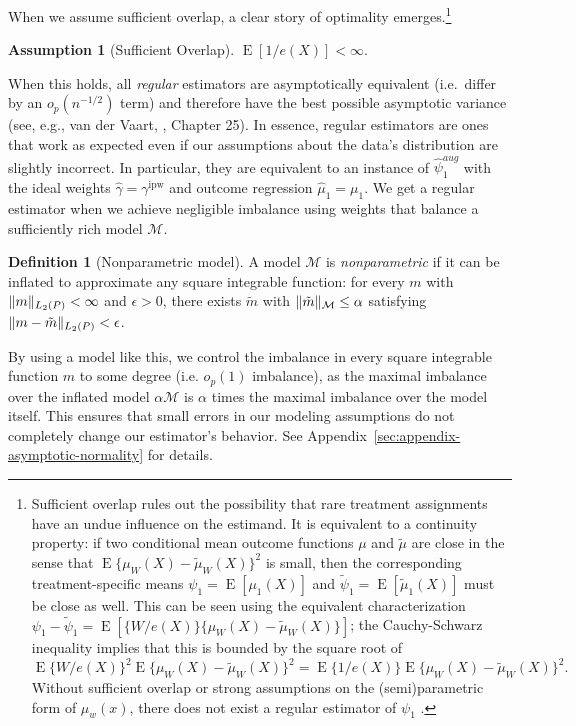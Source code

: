 \documentclass{article}
\DeclarePairedDelimiter\norm{\lVert}{\rVert}
\theoremstyle{definition}
\newtheorem{assumption}{Assumption}
\newtheorem{definition}{Definition}
\DeclareMathOperator{\E}{E}
\newcommand{\ipw}{\text{ipw}}
\newcommand{\hgamma}{\ensuremath{\hat\gamma}}
\newcommand{\gammaipw}{\ensuremath{\gamma^{\ipw}}}
\newcommand{\model}{\mathcal{M}}
\newcommand{\<}{\langle}
\renewcommand{\>}{\rangle}
\begin{document}
When we assume sufficient overlap, a clear story of optimality emerges.\footnote{Sufficient overlap rules out the possibility that rare treatment assignments have an undue influence on the estimand. It is equivalent to a continuity property: if two conditional mean outcome functions $\mu$ and $\tilde \mu$ are close in the sense that $\E \{\mu_W(X)-\tilde \mu_W(X)\}^2$
is small, then the corresponding treatment-specific means $\psi_1=\E[\mu_1(X)]$ and $\tilde\psi_1 = \E[\tilde \mu_1(X)]$ must be close as well. This can be seen using the equivalent characterization $\psi_1-\tilde \psi_1 = \E[\{W/e(X)\} \{\mu_{W}(X)-\tilde \mu_{W}(X)\}]$; the Cauchy-Schwarz inequality implies that this is bounded by the square root of
$\E\{W/e(X)\}^2 \E\{\mu_{W}(X)-\tilde \mu_{W}(X)\}^2=\E\{1/e(X)\} \E\{\mu_{W}(X)-\tilde \mu_{W}(X)\}^2.$
Without sufficient overlap or strong assumptions on the (semi)parametric form of $\mu_w(x)$, there does not exist a regular estimator of $\psi_1$ \citep{van1991differentiable}.}
{\addtocounter{assumption}{-1}%
   \renewcommand{\theassumption}{\arabic{assumption}$'$}
\begin{assumption}[Sufficient Overlap]
\label{a:regular-overlap}
$\E[1 / e(X)] < \infty.$
\addtocounter{theorem}{-1}
\end{assumption}}
When this holds, all \emph{regular} estimators are asymptotically equivalent (i.e.\ differ by an $o_p(n^{-1/2})$ term) and therefore have the best possible asymptotic variance (see, e.g., van der Vaart, \citeyear{van2000asymptotic}, Chapter 25). In essence, regular estimators are ones that work as expected even if our assumptions about the data's distribution are slightly incorrect. In particular, they are equivalent to an instance of $\hat\psi_1^{aug}$ with the ideal weights $\hgamma=\gammaipw$ and  outcome regression  $\hat \mu_1=\mu_1$.
We get a regular estimator when we achieve negligible imbalance using weights that balance a
sufficiently rich model $\model$. \begin{definition}[Nonparametric model]
\label{def:nonparametric}
A model $\model$ is \emph{nonparametric} if it can be inflated to approximate any square integrable function:
for every $m$ with $\norm{m}_{L_2(P)} < \infty$ and $\epsilon>0$, there exists $\tilde m$ with $\norm{\tilde m}_\model \le \alpha$ satisfying $\norm{m-\tilde m}_{L_2(P)} < \epsilon$.
\end{definition}
By using a model like this, we control the imbalance in every square integrable function $m$ to some degree (i.e. $o_p(1)$ imbalance), as the maximal imbalance over the inflated model $\alpha \model$ is $\alpha$ times the maximal imbalance over the model itself. This ensures that small errors in our modeling assumptions do not completely change our estimator's behavior. See Appendix~\ref{sec:appendix-asymptotic-normality} for details.
\end{document}

